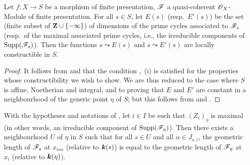 \begin{proposition}[9.8.5]
\label{IV.9.8.5}
Let $f:X\to S$ be a morphism of finite presentation, $\mathscr{F}$ a quasi-coherent $\mathscr{O}_X$-Module of finite presentation.
For all $s\in S$, let $E(s)$ \textup{(resp.~$E'(s)$)} be the set (finite subset of $\mathbf{Z}\cup\{-\infty\}$) of dimensions of the prime cycles associated to $\mathscr{F}_s$ \textup{(resp.}~of the maximal associated prime cycles, i.e., the irreducible components of $\operatorname{Supp}(\mathscr{F}_s)$\textup{)}.
Then the functions $s\leadsto E(s)$ and $s\leadsto E'(s)$ are locally constructible in $S$.
\end{proposition}

\begin{proof}
\label{IV.9.8.5-proof}
It follows from  and  that the condition ,~(i) is satisfied for the properties whose constructibility we wish to show.
We are thus reduced to the case where $S$ is affine, Noetherian and integral, and to proving that $E$ and $E'$ are constant in a neighbourhood of the generic point $\eta$ of $S$; but this follows from  and .
\end{proof}

\begin{proposition}[9.8.6]
\label{IV.9.8.6}
With the hypotheses and notations of \emph{}, let $i\in I$ be such that $(Z_i)_\eta$ is maximal (in other words, an irreducible component of $\operatorname{Supp}(\mathscr{F}_\eta)$).
Then there exists a neighbourhood $U$ of $\eta$ in $S$ such that for all $s\in U$ and all $\alpha\in J_{s,i}$, the geometric length of $\mathscr{F}_s$ at $x_{is\alpha}$ (relative to $\boldsymbol{k}(s)$)  is equal to the geometric length of $\mathscr{F}_\eta$ at $x_i$ (relative to $\boldsymbol{k}(\eta)$).
\end{proposition}

